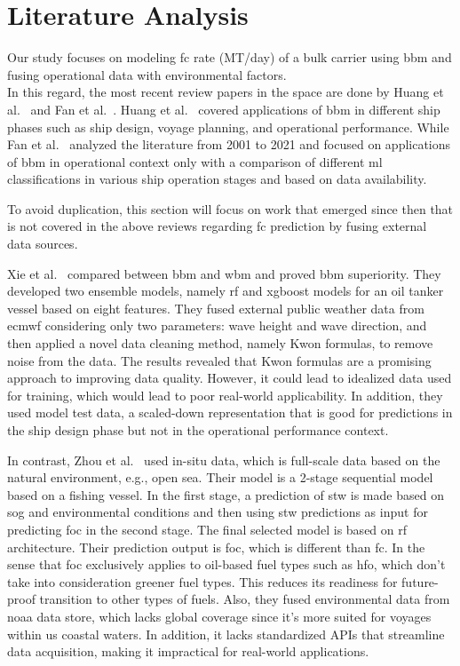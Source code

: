 \section{Literature Analysis}\label{sec:literature_analysis}

Our study focuses on modeling \ac{fc} rate (MT/day) of a bulk carrier using \ac{bbm} and fusing operational data with environmental factors. \\
In this regard, the most recent review papers in the space are done by Huang et al.~\citep{huangMachineLearningSustainable2022} and Fan et al.~\citep{fanReviewShipFuel}.  
Huang et al.~\citep{huangMachineLearningSustainable2022} covered applications of \ac{bbm} in different ship phases such as ship design, voyage planning, and operational performance. 
While Fan et al.~\citep{fanReviewShipFuel} analyzed the literature from 2001 to 2021 and focused on applications of \ac{bbm} in operational context only with a comparison of different 
\ac{ml} classifications in various ship operation stages and based on data availability.

To avoid duplication, this section will focus on work that emerged since then that is not covered in the above reviews regarding \ac{fc} prediction by fusing external data sources. 

Xie et al.~\citep{xieFuelConsumptionPrediction2023} compared between \ac{bbm} and \ac{wbm} and proved \ac{bbm} superiority. They developed two ensemble models, namely \ac{rf} and 
\ac{xgboost} models for an oil tanker vessel based on eight features. They fused external public weather data from \ac{ecmwf} considering only two parameters: wave height and wave direction, and then applied a novel data cleaning method, namely Kwon formulas, to remove noise from the data. The results revealed that Kwon formulas are a promising approach to improving data quality. However, it could lead to idealized data used for training, which would lead to poor real-world applicability. In addition, 
they used model test data, a scaled-down representation that is good for predictions in the ship design phase but not in the operational performance context.

In contrast, Zhou et al.~\citep{zhouPredictingShipFuel2023} used in-situ data, which is full-scale data based on the natural environment, e.g., open sea. 
Their model is a 2-stage sequential model based on a fishing vessel. In the first stage, a prediction of \ac{stw} is made based on \ac{sog} and environmental conditions and then using 
\ac{stw} predictions as input for predicting \ac{foc} in the second stage. The final selected model is based on \ac{rf} architecture. Their prediction output is \ac{foc}, which is different than \ac{fc}.
In the sense that \ac{foc} exclusively applies to oil-based fuel types such as \ac{hfo}, which don't take into consideration greener fuel types. This reduces its readiness for future-proof transition to other types of fuels. 
Also, they fused environmental data from \ac{noaa} data store, which lacks global coverage since it's more suited for voyages within \ac{us} coastal waters. In addition, it lacks standardized APIs that streamline data acquisition, making it impractical for real-world applications. 

